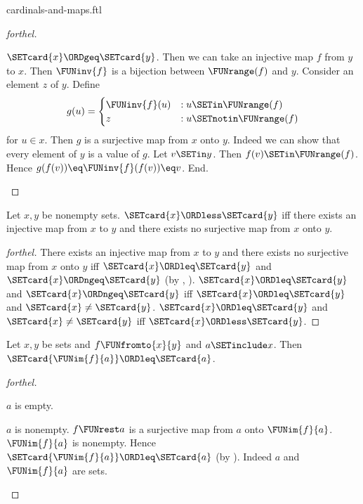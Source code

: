 \documentclass{stex}
\begin{document}
\begin{smodule}{cardinals-and-maps.ftl}
\begin{proof}[forthel]
  \begin{case}{$\SETcard{x} \ORDgeq \SETcard{y}$.}
    Then we can take an injective map $f$ from $y$ to $x$.
    Then $\FUNinv{f}$ is a bijection between $\FUNrange(f)$ and $y$.
    Consider an element $z$ of $y$.
    Define \[ g(u) =
      \begin{cases}
        \FUNinv{f}(u) & : u \SETin \FUNrange(f) \\
        z         & : u \SETnotin \FUNrange(f)
      \end{cases} \]
    for $u \in x$.
    Then $g$ is a surjective map from $x$ onto $y$.
    Indeed we can show that every element of $y$ is a value of $g$.
      Let $v \SETin y$.
      Then $f(v) \SETin \FUNrange(f)$.
      Hence $g(f(v)) \eq \FUNinv{f}(f(v)) \eq v$.
    End.
  \end{case}
\end{proof}

\begin{proposition}[forthel,id=SET_THEORY_06_5843717288099840]
  Let $x, y$ be nonempty sets.
  $\SETcard{x} \ORDless \SETcard{y}$ iff there exists an injective map from $x$ to $y$ and there exists no surjective map from $x$ onto $y$.
\end{proposition}
\begin{proof}[forthel]
  There exists an injective map from $x$ to $y$ and there exists no surjective map from $x$ onto $y$ iff $\SETcard{x} \ORDleq \SETcard{y}$ and $\SETcard{x} \ORDngeq \SETcard{y}$ (by , ).
  $\SETcard{x} \ORDleq \SETcard{y}$ and $\SETcard{x} \ORDngeq \SETcard{y}$ iff $\SETcard{x} \ORDleq \SETcard{y}$ and $\SETcard{x} \neq \SETcard{y}$.
  $\SETcard{x} \ORDleq \SETcard{y}$ and $\SETcard{x} \neq \SETcard{y}$ iff $\SETcard{x} \ORDless \SETcard{y}$.
\end{proof}

\begin{proposition}[forthel,id=SET_THEORY_06_8113916590686208]
  Let $x, y$ be sets and $f \FUNfromto{x}{y}$ and $a \SETinclude x$.
  Then $\SETcard{\FUNim{f}{a}} \ORDleq \SETcard{a}$.
\end{proposition}
\begin{proof}[forthel]
  \begin{case}{$a$ is empty.} \end{case}

  \begin{case}{$a$ is nonempty.}
    $f \FUNrest a$ is a surjective map from $a$ onto $\FUNim{f}{a}$.
    $\FUNim{f}{a}$ is nonempty.
    Hence $\SETcard{\FUNim{f}{a}} \ORDleq \SETcard{a}$ (by ).
    Indeed $a$ and $\FUNim{f}{a}$ are sets.
  \end{case}
\end{proof}
\end{smodule}
\end{document}
